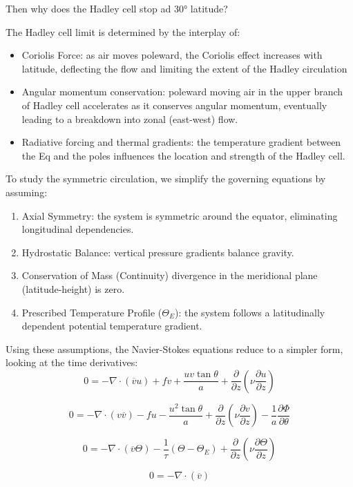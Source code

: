 Then why does the Hadley cell stop ad 30° latitude?

The Hadley cell limit is determined by the interplay of:
\begin{itemize}
	\item Coriolis Force: as air moves poleward, the Coriolis effect increases with latitude, deflecting the flow and limiting the extent of the Hadley circulation
	\item Angular momentum conservation: poleward moving air in the upper branch of Hadley cell accelerates as it conserves angular momentum, eventually leading to a breakdown into zonal (east-west) flow.
	\item Radiative forcing and thermal gradients: the temperature gradient between the Eq and the poles influences the location and strength of the Hadley cell.
\end{itemize}

To study the symmetric circulation, we simplify the governing equations by assuming:
\begin{enumerate}
	\item Axial Symmetry: the system is symmetric around the equator, eliminating longitudinal dependencies.
	\item Hydrostatic Balance: vertical pressure gradients balance gravity.
	\item Conservation of Mass (Continuity) divergence in the meridional plane (latitude-height) is zero.
	\item Prescribed Temperature Profile ($\Theta_E$): the system follows a latitudinally dependent potential temperature gradient.
\end{enumerate}
Using these assumptions, the Navier-Stokes equations reduce to a simpler form, looking at the time derivatives:
\[
	0 = -\nabla \cdot ({\overline{v}}{u}) + f v
	+ \frac{u v \tan \theta}{a}
	+ \frac{\partial}{\partial z} \left( \nu \frac{\partial u}{\partial z} \right)
\]

\[
	0 = -\nabla \cdot (v \overline{v}) - f u
	- \frac{u^2 \tan \theta}{a}
	+ \frac{\partial}{\partial z} \left( \nu \frac{\partial v}{\partial z} \right)
	- \frac{1}{a} \frac{\partial \Phi}{\partial \theta}
\]

\[
	0 = -\nabla \cdot ({\overline{v}} {\Theta})
	- \frac{1}{\tau} (\Theta - \Theta_E)
	+ \frac{\partial}{\partial z} \left( \nu \frac{\partial \Theta}{\partial z} \right)
\]

\[
	0 = -\nabla \cdot ({\overline{v}})
\]

